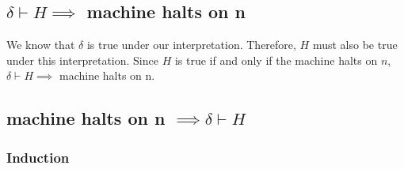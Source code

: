 \subsection{$\delta \vdash H \implies$ machine halts on n}

We know that $\delta$ is true under our interpretation.  Therefore, $H$ must also be true under this interpretation.
Since $H$ is true if and only if the machine halts on $n$, $\delta \vdash H \implies$ machine halts on n.

\subsection{machine halts on n $\implies \delta \vdash H$}

\subsubsection{Induction}
